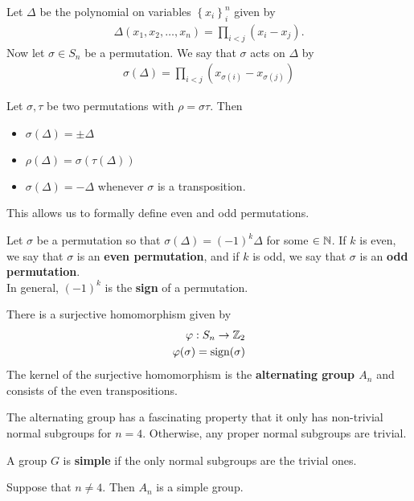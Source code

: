 \documentclass{memoir}
\begin{document}
Let \(\Delta \) be the polynomial on variables \(\left\{ x_i \right\}_i^{n}\) given by
\begin{align*}
	\Delta (x_1,x_2,\ldots,x_n) = \prod_{i<j} (x_i - x_j). 
\end{align*}
Now let \(\sigma  \in S_n\) be a permutation. We say that \(\sigma \) acts on \(\Delta \) by
\begin{align*}
	\sigma (\Delta ) = \prod_{i<j} (x_{\sigma (i)} - x_{\sigma (j)}) 
\end{align*}
\begin{prop}
	Let \(\sigma,\tau  \) be two permutations with \(\rho =\sigma \tau \). Then
	\begin{itemize}
		\item \(\sigma (\Delta ) = \pm \Delta \) 
		\item \(\rho (\Delta ) = \sigma (\tau (\Delta ))\) 
		\item \(\sigma (\Delta ) = -\Delta \) whenever \(\sigma \) is a transposition.
	\end{itemize}
\end{prop}
This allows us to formally define even and odd permutations.
\begin{defn}
	Let \(\sigma \) be a permutation so that \(\sigma (\Delta ) = (-1)^{k}\Delta \) for some \( \in \mathbb{N}\). If \(k\) is even, we say that \(\sigma \) is an \textbf{even permutation}, and if \(k\) is odd, we say that \(\sigma \) is an \textbf{odd permutation}.\\

	In general, \((-1)^{k}\) is the \textbf{sign} of a permutation.
\end{defn}

\begin{prop}
There is a surjective homomorphism given by
\begin{align*}
	\varphi :S_n \to \mathbb{Z}_2\\
	\varphi (\sigma ) = \textrm{sign}(\sigma )
\end{align*}
The kernel of the surjective homomorphism is the \textbf{alternating group \(A_n\)} and consists of the even transpositions.
\end{prop}

The alternating group has a fascinating property that it only has non-trivial normal subgroups for \(n=4\). Otherwise, any proper normal subgroups are trivial.

\begin{defn}[Simple]
	A group \(G\) is \textbf{simple} if the only normal subgroups are the trivial ones.
\end{defn}

\begin{thm}
	Suppose that \(n\neq 4\). Then \(A_n\) is a simple group.
\end{thm}

\end{document}
